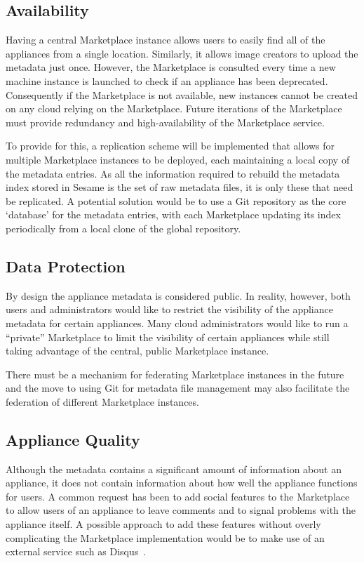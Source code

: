 \subsection{Availability}

Having a central Marketplace instance allows users to easily find all
of the appliances from a single location.  Similarly, it allows image
creators to upload the metadata just once.  However, the Marketplace
is consulted every time a new machine instance is launched to check if
an appliance has been deprecated.  Consequently if the Marketplace is
not available, new instances cannot be created on any cloud relying on
the Marketplace\@.  Future iterations of the Marketplace must provide
redundancy and high-availability of the Marketplace service. 

To provide for this, a replication scheme will be implemented that
allows for multiple Marketplace instances to be deployed, each
maintaining a local copy of the metadata entries. As all the
information required to rebuild the metadata index stored in Sesame is
the set of raw metadata files, it is only these that need be
replicated.  A potential solution would be to use a Git repository as
the core `database' for the metadata entries, with each Marketplace
updating its index periodically from a local clone of the global
repository.

\subsection{Data Protection}

By design the appliance metadata is considered public.  In reality,
however, both users and administrators would like to restrict the
visibility of the appliance metadata for certain appliances.  Many
cloud administrators would like to run a ``private'' Marketplace to
limit the visibility of certain appliances while still taking
advantage of the central, public Marketplace instance.

There must be a mechanism for federating Marketplace instances in the
future and the move to using Git for metadata file management may also
facilitate the federation of different Marketplace instances.

\subsection{Appliance Quality}

Although the metadata contains a significant amount of information
about an appliance, it does not contain information about how well the
appliance functions for users.  A common request has been to add
social features to the Marketplace to allow users of an appliance to
leave comments and to signal problems with the appliance itself.  A
possible approach to add these features without overly complicating
the Marketplace implementation would be to make use of an external
service such as Disqus~\cite{disqus}.

